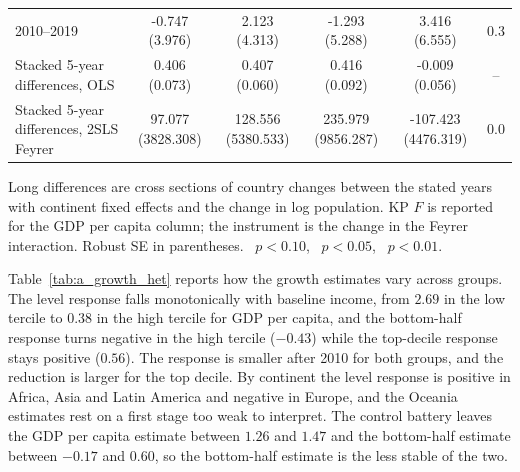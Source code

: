\begin{table}[H]
\begin{threeparttable}
\begin{tabular}{lccccc}
2010--2019 & -0.747 (3.976) & 2.123 (4.313) & -1.293 (5.288) & 3.416 (6.555) & 0.3 \\
\addlinespace
Stacked 5-year differences, OLS & 0.406\sym{***} (0.073) & 0.407\sym{***} (0.060) & 0.416\sym{***} (0.092) & -0.009 (0.056) & -- \\
Stacked 5-year differences, 2SLS Feyrer & 97.077 (3828.308) & 128.556 (5380.533) & 235.979 (9856.287) & -107.423 (4476.319) & 0.0 \\
\bottomrule
\end{tabular}
\begin{tablenotes}\footnotesize\item Long differences are cross sections of country changes between the stated years with continent fixed effects and the change in log population. KP $F$ is reported for the GDP per capita column; the instrument is the change in the Feyrer interaction. Robust SE in parentheses. \sym{*}~$p<0.10$, \sym{**}~$p<0.05$, \sym{***}~$p<0.01$.\end{tablenotes}\end{threeparttable}\end{table}

Table~\ref{tab:a_growth_het} reports how the growth estimates vary across groups. The level response falls monotonically with baseline income, from $2.69$ in the low tercile to $0.38$ in the high tercile for GDP per capita, and the bottom-half response turns negative in the high tercile ($-0.43$) while the top-decile response stays positive ($0.56$). The response is smaller after 2010 for both groups, and the reduction is larger for the top decile. By continent the level response is positive in Africa, Asia and Latin America and negative in Europe, and the Oceania estimates rest on a first stage too weak to interpret. The control battery leaves the GDP per capita estimate between $1.26$ and $1.47$ and the bottom-half estimate between $-0.17$ and $0.60$, so the bottom-half estimate is the less stable of the two.

